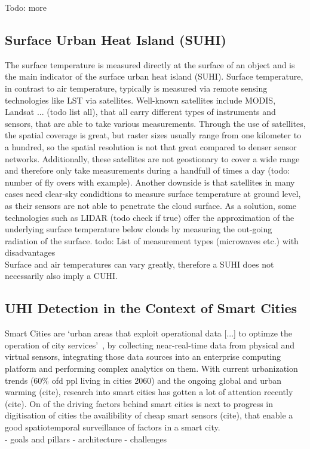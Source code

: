 Todo: more

\subsection{Surface Urban Heat Island (SUHI)}

The surface temperature is measured directly at the surface of an object and is the main indicator of the surface urban heat island (SUHI). Surface temperature, in contrast to air temperature, typically is measured via remote sensing technologies like LST via satellites. Well-known satellites include MODIS, Landsat ... (todo list all), that all carry different types of instruments and sensors, that are able to take various measurements. Through the use of satellites, the spatial coverage is great, but raster sizes usually range from one kilometer to a hundred, so the spatial resolution is not that great compared to denser sensor networks. Additionally, these satellites are not geostionary to cover a wide range and therefore only take measurements during a handfull of times a day (todo: number of fly overs with example). Another downside is that satellites in many cases need clear-sky condidtions to measure surface temperature at ground level, as their sensors are not able to penetrate the cloud surface. As a solution, some technologies such as LIDAR (todo check if true) offer the approximation of the underlying surface temperature below clouds by measuring the out-going radiation of the surface.
todo: List of measurement types (microwaves etc.) with disadvantages\\
Surface and air temperatures can vary greatly, therefore a SUHI does not necessarily also imply a CUHI.

\subsection{UHI Detection in the Context of Smart Cities}

Smart Cities are `urban areas that exploit operational data [...] to optimze the operation of city services'~\cite{harrison2010foundations}, by collecting near-real-time data from physical and virtual sensors, integrating those data sources into an enterprise computing platform and performing complex analytics on them. With current urbanization trends (60\% ofd ppl living in cities 2060) and the ongoing global and urban warming (cite), research into smart cities has gotten a lot of attention recently (cite). On of the driving factors behind smart cities is next to progress in digitisation of cities the availibility of cheap smart sensors (cite), that enable a good spatiotemporal surveillance of factors in a smart city.\\
- goals and pillars
- architecture
- challenges

